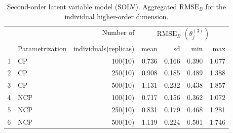 %
\begin{table}[H]
	\centering
	\begin{tabular}{rlrrrrr}
		\hline
		\multicolumn{2}{c}{ } & Number of & \multicolumn{4}{c}{ $\text{RMSE}_{B}$ $( \theta^{(3)}_{j} )$ } \\ 
		\cmidrule(rl){4-7}
		& Parametrization & individuals(replicas) & mean & sd & min & max \\  
		\hline\hline
		1 & CP &  100(10) & 0.736 & 0.166 & 0.390 & 1.077 \\ 
		2 & CP &  250(10) & 0.908 & 0.185 & 0.489 & 1.388 \\
		3 & CP &  500(10) & 1.131 & 0.232 & 0.438 & 1.857 \\ 
		\hline
		4 & NCP &  100(10) & 0.717 & 0.156 & 0.362 & 1.072 \\  
		5 & NCP &  250(10) & 0.831 & 0.179 & 0.468 & 1.281 \\
		6 & NCP &  500(10) & 1.119 & 0.224 & 0.501 & 1.746 \\   
		\hline
	\end{tabular}
	\caption[Second-order latent variable model (SOLV). Aggregated $\text{RMSE}_{B}$ for the individual higher-order dimension.]%
	{Second-order latent variable model (SOLV). Aggregated $\text{RMSE}_{B}$ for the individual higher-order dimension.}
	\label{tab:SOLV_RMSE_theta}
\end{table}
%
